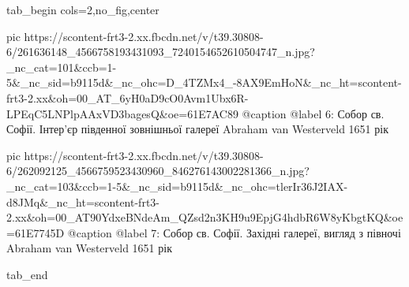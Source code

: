  
 
 
 
 


\ifcmt
  tab_begin cols=2,no_fig,center

     pic https://scontent-frt3-2.xx.fbcdn.net/v/t39.30808-6/261636148_4566758193431093_7240154652610504747_n.jpg?_nc_cat=101&ccb=1-5&_nc_sid=b9115d&_nc_ohc=D_4TZMx4_-8AX9EmHoN&_nc_ht=scontent-frt3-2.xx&oh=00_AT_6yH0aD9cO0Avm1Ubx6R-LPEqC5LNPlpAAxVD3bagesQ&oe=61E7AC89
     @caption @label 6: Собор св. Софії. Інтер'єр південної зовнішньої галереї Abraham van Westerveld 1651 рік

     pic https://scontent-frt3-2.xx.fbcdn.net/v/t39.30808-6/262092125_4566759523430960_846276143002281366_n.jpg?_nc_cat=103&ccb=1-5&_nc_sid=b9115d&_nc_ohc=tlerIr36J2IAX-d8JMq&_nc_ht=scontent-frt3-2.xx&oh=00_AT90YdxeBNdeAm_QZsd2n3KH9u9EpjG4hdbR6W8yKbgtKQ&oe=61E7745D
     @caption @label 7: Собор св. Софії. Західні галереї, вигляд з півночі Abraham van Westerveld 1651 рік

  tab_end
\fi
